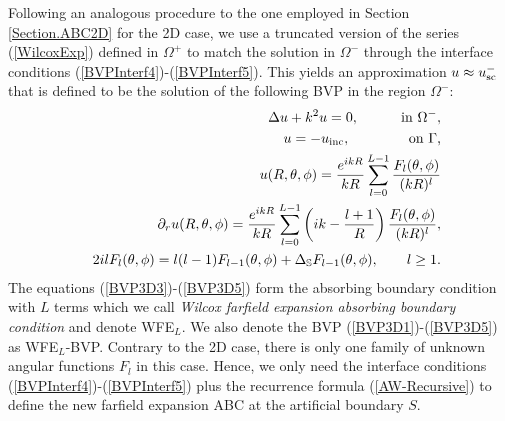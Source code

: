 \documentclass[final,3p,times,12pt]{elsarticle}
\newcommand{\usc}{u_{\rm sc}}
\newcommand{\uinc}{u_{\rm inc}}
\newcommand{\Sph}{\mathbb{S}}
\begin{document}
 {Following an analogous procedure to the one employed in Section \ref{Section.ABC2D} for the 2D case, we use a truncated version of the series (\ref{WilcoxExp}) defined in $\Omega^{+}$ to match the solution in $\Omega^{-}$ through the interface conditions (\ref{BVPInterf4})-(\ref{BVPInterf5}).} This yields an approximation $u \approx \usc^{-}$ that is defined to be the solution of the following BVP in the region $\Omega^{-}$:
\begin{eqnarray}
&& \Delta u + k^2 u = 0, \quad\qquad  \text{in $\Omega^{-}$}, \label{BVP3D1} \\
&& u = - \uinc, \qquad\qquad\,  \text{on $\Gamma$,} \label{BVP3D2} \\
&& u(R,\theta,\phi)=\frac{e^{ikR}}{kR}\sum_{l=0}^{L-1} \frac{F_l(\theta,\phi)}{(kR)^l}\label{BVP3D3} \\
&&\partial_{r} u(R,\theta,\phi) = \frac{e^{i k R}}{k R} \sum_{l=0}^{L-1} \left( ik - \frac{l+1}{R} \right) \frac{F_{l}(\theta,\phi)}{(kR)^l}, \label{BVP3D4}\\
&& 2ilF_l(\theta,\phi) = l(l-1) F_{l-1}(\theta,\phi) + \Delta_{\Sph} F_{l-1}(\theta,\phi), \qquad l \geq 1. \label{BVP3D5}
\end{eqnarray}
The equations (\ref{BVP3D3})-(\ref{BVP3D5}) form the absorbing boundary condition with $L$ terms which we call {\it Wilcox farfield expansion absorbing boundary condition} and denote WFE$_L$. We also denote the BVP (\ref{BVP3D1})-(\ref{BVP3D5}) as WFE$_L$-BVP.
 {Contrary to the 2D case, there is only one family of unknown angular functions $F_l$ in this case. Hence, we only need the interface conditions (\ref{BVPInterf4})-(\ref{BVPInterf5}) plus the recurrence formula (\ref{AW-Recursive}) to define the new farfield expansion ABC at the artificial boundary $S$.}
\end{document}
